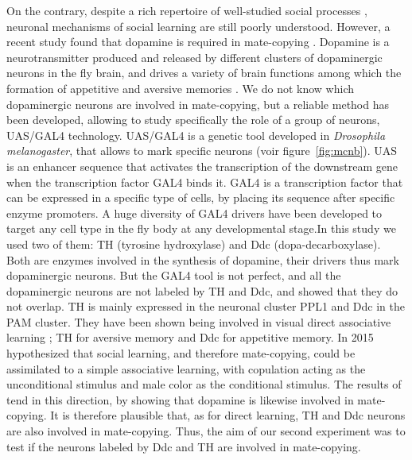 \documentclass[a4paper, 12pt]{article}
\begin{document}
On the contrary, despite a rich repertoire of well-studied social processes \parencite{pasquaretta_how_2016, teseo_fighting_2016, dawson_social_2018}, neuronal mechanisms of social learning are still poorly understood.  However, a recent study found that dopamine is required in mate-copying \parencite{monier_dopamine_2018}. Dopamine is a neurotransmitter produced and released by different clusters of dopaminergic neurons in the fly brain, and drives a variety of brain functions among which the formation of appetitive and aversive memories \parencite{riemensperger_punishment_2005, sitaraman_serotonin_2008, alekseyenko_targeted_2010, berry_dopamine_2012, yamamoto_dopamine_2014}. We do not know which dopaminergic neurons are involved in mate-copying, but a reliable method has been developed, allowing to study specifically the role of a group of neurons, UAS/GAL4 technology. UAS/GAL4 is a genetic tool developed in \textit{Drosophila melanogaster}, that allows to mark specific neurons (voir figure~\ref{fig:mcnb}). UAS is an enhancer sequence that activates the transcription of the downstream gene when the transcription factor GAL4 binds it. GAL4 is a transcription factor that can be expressed in a specific type of cells, by placing its sequence after specific enzyme promoters. A huge diversity of GAL4 drivers have been developed to target any cell type in the fly body at any developmental stage.In this study we used two of them: TH (tyrosine hydroxylase) and Ddc (dopa-decarboxylase). Both are enzymes involved in the synthesis of dopamine, their drivers thus mark dopaminergic neurons. But the GAL4 tool is not perfect, and all the dopaminergic neurons are not labeled by TH and Ddc, and \textcite{liu_subset_2012} showed that they do not overlap. TH is mainly expressed in the neuronal cluster PPL1 and Ddc in the PAM cluster. They have been shown being involved in visual direct associative learning \parencite{vogt_shared_2014}; TH for aversive memory and Ddc for appetitive memory. In 2015 \textcite{avargues_information_2015} hypothesized that social learning, and therefore mate-copying, could be assimilated to a simple associative learning, with copulation acting as the unconditional stimulus and male color as the conditional stimulus. The results of \textcite{monier_dopamine_2018} tend in this direction, by showing that dopamine is likewise involved in mate-copying. It is therefore plausible that, as for direct learning, TH and Ddc neurons are also involved in mate-copying. Thus, the aim of our second experiment was to test if the neurons labeled by Ddc and TH are involved in mate-copying.
	
\end{document}
